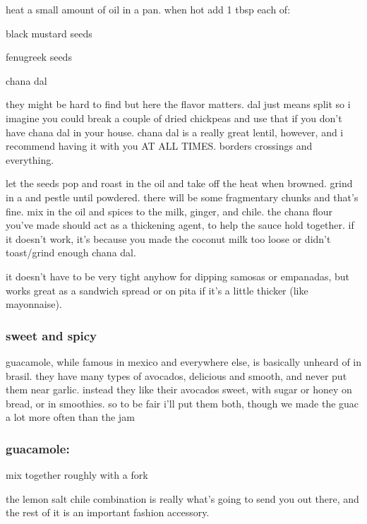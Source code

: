 heat a small amount of oil in a pan. when hot add 1 tbsp each of:

\begin{ingredients}
  \item black mustard seeds
  \item fenugreek seeds
  \item chana dal
\end{ingredients}

they might be hard to find but here the flavor matters. dal just means split 
so i imagine you could break a couple of dried chickpeas and use that if you 
don't have chana dal in your house. chana dal is a really great lentil, 
however, and i recommend having it with you AT ALL TIMES. borders crossings 
and everything.

let the seeds pop and roast in the oil and take off the heat when browned. 
grind in a  and pestle until powdered. there will be some fragmentary 
chunks and that's fine. mix in the oil and spices to the milk, ginger, and 
chile. the chana flour you've made should act as a thickening agent, to help 
the sauce hold together. if it doesn't work, it's because you made the coconut 
milk too loose or didn't toast/grind enough chana dal.

it doesn't have to be very tight anyhow for dipping samosas or empanadas, but 
works great as a sandwich spread or on pita if it's a little thicker (like 
mayonnaise).

\subsubsection{sweet and spicy }

guacamole, while famous in mexico and everywhere else, is basically unheard of 
in brasil. they have many types of avocados, delicious and smooth, and never 
put them near garlic. instead they like their avocados sweet, with sugar or 
honey on bread, or in smoothies. so to be fair i'll put them both, though we 
made the guac a lot more often than the jam

\subsubsection{guacamole:}

\begin{ingredients}
  \item mix together roughly with a fork
  \item the lemon salt chile combination is really what's going to send you 
  out there, and the rest of it is an important fashion accessory.
\end{ingredients}

